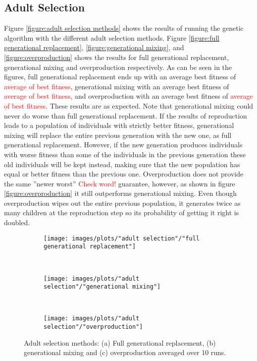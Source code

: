 \subsection{Adult Selection}
Figure \ref{figure:adult selection methods} shows the results of running the genetic algorithm with the different adult selection methods. Figure \ref{figure:full generational replacement}, \ref{figure:generational mixing}, and \ref{figure:overproduction} shows the results for full generational replacement, generational mixing and overproduction respectively. As can be seen in the figures, full generational replacement ends up with an average best fitness of \textcolor{red}{average of best fitness}, generational mixing with an average best fitness of \textcolor{red}{average of best fitness}, and overproduction with an average best fitness of \textcolor{red}{average of best fitness}. These results are as expected. Note that generational mixing could never do worse than full generational replacement. If the results of reproduction leads to a population of individuals with strictly better fitness, generational mixing will replace the entire previous generation with the new one, as full generational replacement. However, if the new generation produces individuals with worse fitness than some of the individuals in the previous generation these old individuals will be kept instead, making sure that the new population has equal or better fitness than the previous one. Overproduction does not provide the same ''newer worst'' \textcolor{red}{Check word!} guarantee, however, as shown in figure \ref{figure:overproduction} it still outperforms generational mixing. Even though overproduction wipes out the entire previous population, it generates twice as many children at the reproduction step so its probability of getting it right is doubled. 


\begin{figure}[h!]
    \centering
    \begin{subfigure}[b]{0.31\textwidth}
        \texttt{[image: images/plots/"adult selection"/"full generational replacement"]}
        \caption{}
        \hfill
        \label{plot:full generational replacement}
    \end{subfigure}
    ~
    \begin{subfigure}[b]{0.31\textwidth}
        \texttt{[image: images/plots/"adult selection"/"generational mixing"]}
        \caption{}
        \hfill
        \label{plot:generational mixing}
    \end{subfigure}
    ~
    \begin{subfigure}[b]{0.31\textwidth}
        \texttt{[image: images/plots/"adult selection"/"overproduction"]}
        \caption{}
        \hfill
        \label{plot:overproduction}
    \end{subfigure}
    \caption{Adult selection methods: (a) Full generational replacement, (b) generational mixing and (c) overproduction averaged over 10 runs.}
    \label{plot:adult selection methods}
\end{figure}


